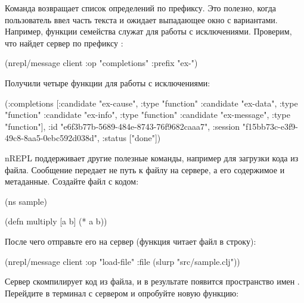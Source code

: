 Команда  возвращает список определений по префиксу. Это полезно, когда пользователь ввел часть текста и ожидает выпадающее окно с вариантами. Например, функции семейства  служат для работы с исключениями. Проверим, что найдет сервер по префиксу :

\begin{english}
  \begin{clojure}
(nrepl/message client {:op "completions" :prefix "ex-"})
  \end{clojure}
\end{english}

Получили четыре функции для работы с исключениями:

\begin{english}
  \begin{clojure}
({:completions
  [{:candidate "ex-cause", :type "function"}
   {:candidate "ex-data", :type "function"}
   {:candidate "ex-info", :type "function"}
   {:candidate "ex-message", :type "function"}],
  :id "e6f3b77b-5689-484e-8743-76f9682caaa7",
  :session "f15bb73c-e3f9-49c8-8aa5-0ebc592d038d",
  :status ["done"]})
  \end{clojure}
\end{english}

nREPL поддерживает другие полезные команды, например  для загрузки кода из файла. Сообщение передает не путь к файлу на сервере, а его содержимое и метаданные. Создайте файл  с кодом:

\begin{english}
  \begin{clojure}
(ns sample)

(defn multiply [a b]
  (* a b))
  \end{clojure}
\end{english}

После чего отправьте его на сервер (функция  читает файл в строку):

\begin{english}
  \begin{clojure}
(nrepl/message client {:op "load-file"
                       :file (slurp "src/sample.clj")})
  \end{clojure}
\end{english}

Сервер скомпилирует код из файла, и в результате появится пространство имен . Перейдите в терминал с сервером и опробуйте новую функцию:

